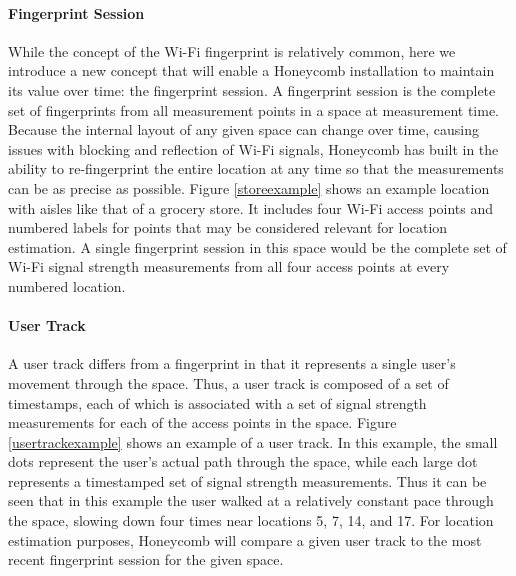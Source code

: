\paragraph{Fingerprint Session}

While the concept of the Wi-Fi fingerprint is relatively common, here we introduce a new concept that will enable a Honeycomb installation to maintain its value over time: the fingerprint session. A fingerprint session is the complete set of fingerprints from all measurement points in a space at measurement time. Because the internal layout of any given space can change over time, causing issues with blocking and reflection of Wi-Fi signals, Honeycomb has built in the ability to re-fingerprint the entire location at any time so that the measurements can be as precise as possible. Figure \ref{storeexample} shows an example location with aisles like that of a grocery store. It includes four Wi-Fi access points and numbered labels for points that may be considered relevant for location estimation. A single fingerprint session in this space would be the complete set of Wi-Fi signal strength measurements from all four access points at every numbered location. 


\paragraph{User Track}
A user track differs from a fingerprint in that it represents a single user's movement through the space. Thus, a user track is composed of a set of timestamps, each of which is associated with a set of signal strength measurements for each of the access points in the space. Figure \ref{usertrackexample} shows an example of a user track. In this example, the small dots represent the user's actual path through the space, while each large dot represents a timestamped set of signal strength measurements. Thus it can be seen that in this example the user walked at a relatively constant pace through the space, slowing down four times near locations 5, 7, 14, and 17. For location estimation purposes, Honeycomb will compare a given user track to the most recent fingerprint session for the given space. 



